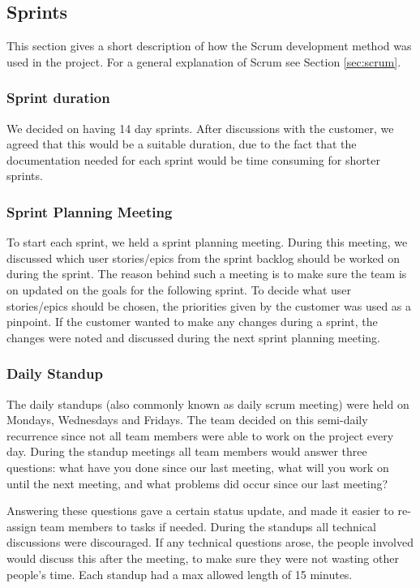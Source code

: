 \subsection{Sprints}
\label{sec:sprints}
This section gives a short description of how the Scrum development method was used in the project. 
For a general explanation of Scrum see Section \ref{sec:scrum}.

\subsubsection{Sprint duration}
We decided on having 14 day sprints. After discussions with the customer,
we agreed that this would be a suitable duration, due to the fact 
that the documentation needed for each sprint would be time consuming 
for shorter sprints.

\subsubsection{Sprint Planning Meeting}
To start each sprint, we held a sprint planning meeting. During this meeting, we discussed which user 
stories/epics from the sprint backlog should be worked on during the sprint. The reason behind such a 
meeting is to make sure the team is on updated on the goals for the following sprint. To decide what 
user stories/epics should be chosen, the priorities given by the customer was used as a pinpoint. If 
the customer wanted to make any changes during a sprint, the changes were noted and discussed during 
the next sprint planning meeting.

\subsubsection{Daily Standup}
The daily standups (also commonly known as daily scrum meeting) were held on Mondays, Wednesdays and 
Fridays. The team decided on this semi-daily recurrence since not all team members were able to work 
on the project every day. During the standup meetings all team members would answer three questions: 
what have you done since our last meeting, what will you work on until the next meeting, and what 
problems did occur since our last meeting?

Answering these questions gave a certain status update, and made it easier to re-assign team members 
to tasks if needed. During the standups all technical discussions were discouraged. If any technical 
questions arose, the people involved would discuss this after the meeting, to make sure they were not 
wasting other people's time. Each standup had a max allowed length of 15 minutes. 

